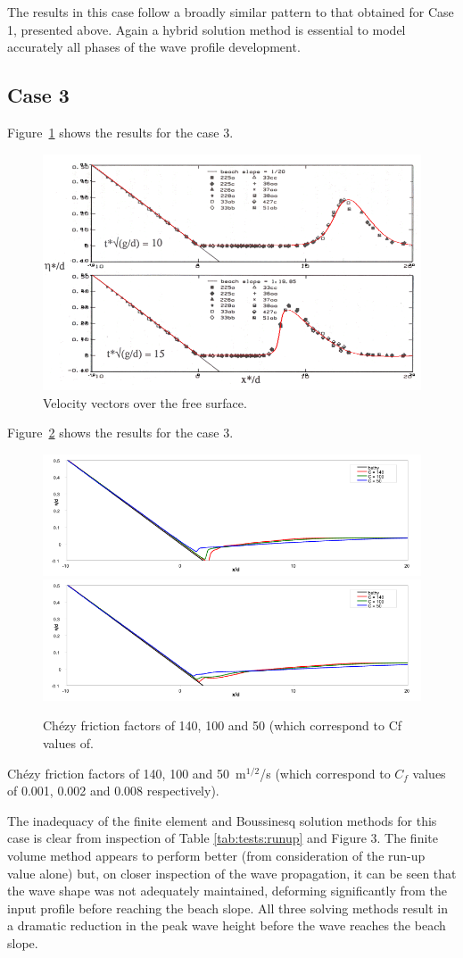 The results in this case follow a broadly similar pattern to that obtained for
Case 1, presented above.  Again a hybrid solution method is essential to model
accurately all phases of the wave profile development.

\subsection{Case 3}

Figure~\ref{fig:tests:case3} shows the results for the case 3.
\begin{figure}[H]
\centering
\includegraphics[width=.6\textwidth]{img/case3.png}
\caption{Velocity vectors over the free surface.}
\label{fig:tests:case3}
\end{figure}


Figure~\ref{fig:tests:chezy} shows the results for the case 3.
\begin{figure}[H]
\centering
\includegraphics[width=.6\textwidth]{img/chezy1.png}
\includegraphics[width=.6\textwidth]{img/chezy2.png}
\caption{Chézy friction factors of 140, 100 and 50 (which correspond to Cf values of.}
\label{fig:tests:chezy}
\end{figure}

Chézy friction factors of 140, 100 and 50~m$^{1/2}$/s (which correspond to $C_f$ values of
0.001, 0.002 and 0.008 respectively).

The inadequacy of the finite element and Boussinesq solution methods for this
case is clear from inspection of Table \ref{tab:tests:runup} and Figure 3.
The finite volume
method appears to perform better (from consideration of the run-up value alone)
but, on closer inspection of the wave propagation, it can be seen that the wave
shape was not adequately maintained, deforming significantly from the input
profile before reaching the beach slope. All three solving methods result in a
dramatic reduction in the peak wave height before the wave reaches the beach
slope.

